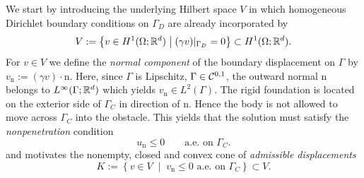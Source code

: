 We start by introducing the underlying Hilbert space $V$ in which homogeneous Dirichlet boundary conditions on $\Gamma_D$ are already incorporated by
\begin{equation*}
	V:= \left\{v\in H^1(\Omega;{\mathbb R}^d)\;\middle|\; (\gamma v)|_{\Gamma_D} = 0\right\}\subset H^1(\Omega;{\mathbb R}^d).
\end{equation*}
For $v\in V$ we define the {\em normal component} of the boundary displacement on $\Gamma$ by $v_\mathrm{n}:= (\gamma v)\cdot\mathrm{n}$. Here, since $\Gamma$ is Lipschitz, $\Gamma\in {\mathcal C}^{0,1}$, the outward normal $\mathrm{n}$ belongs to $L^\infty(\Gamma;{\mathbb R}^d)$ which yields $v_\mathrm{n}\in L^2(\Gamma)$. The rigid foundation is located on the exterior side of $\Gamma_C$ in direction of $\mathrm n$. Hence the body is not allowed to move across $\Gamma_C$ into the obstacle. This yields that the solution must satisfy the {\em nonpenetration} condition
\begin{equation}\label{eq:nonpenetration}
	u_{\mathrm n}\le 0 \qquad \text{a.e.\ on }\Gamma_C.
\end{equation}
and motivates the nonempty, closed and convex cone of {\em admissible displacements}
\begin{equation}\label{eq:admissible}
	K := \left\{ v\in V\;\middle|\; v_{\mathrm n}\le 0 \text{ a.e.\ on }\Gamma_C\right\}\subset V.
\end{equation}

